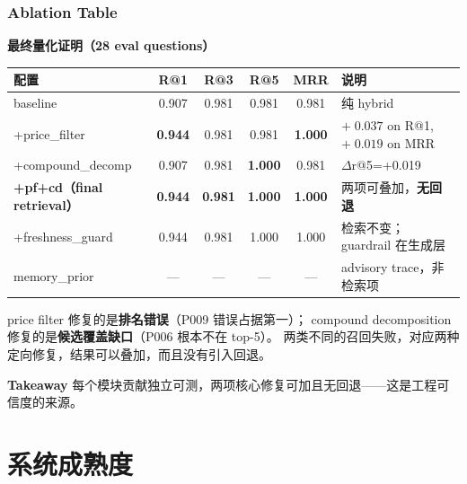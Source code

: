 \documentclass[aspectratio=169,10pt]{beamer}
\newcommand{\takeaway}[1]{%
  \vfill%
  \begin{tcolorbox}[
    colback=Ctakebg, colframe=Ctakebg,
    arc=0pt, boxrule=0pt,
    left=7pt, right=7pt, top=4pt, bottom=4pt,
    width=\linewidth, nobeforeafter
  ]%
    {\scriptsize\color{white}\textbf{Takeaway}\enspace%
     \color{white!88!Ctakebg}#1}%
  \end{tcolorbox}%
}
\newcommand{\hi}[1]{{\bfseries\color{Cgreen}#1}}      %
\begin{document}
\begin{frame}
\frametitle{Ablation Table}

{\small\bfseries\color{Cmuted}最终量化证明（28 eval questions）}\\[0.08cm]
{\footnotesize\renewcommand{\arraystretch}{1.18}
\begin{tabularx}{\textwidth}{lccccX}
\toprule
\bfseries 配置 & \bfseries R@1 & \bfseries R@3 & \bfseries R@5 & \bfseries MRR & \bfseries 说明 \\
\midrule
baseline               & 0.907 & 0.981 & 0.981 & 0.981 & 纯 hybrid \\
\rowcolor{Cgraylt}
+price\_filter         & \hi{0.944} & 0.981 & 0.981 & \hi{1.000} & $+\;0.037$ on R@1,\ $+\;0.019$ on MRR \\
+compound\_decomp      & 0.907 & 0.981 & \hi{1.000} & 0.981 & $\Delta$r@5=+0.019 \\
\rowcolor{Cgreelt}
\bfseries +pf+cd（final retrieval） & \hi{\bfseries 0.944} & \bfseries 0.981 & \hi{\bfseries 1.000} & \hi{\bfseries 1.000} & 两项可叠加，\hi{无回退} \\
+freshness\_guard      & 0.944 & 0.981 & 1.000 & 1.000 & 检索不变；guardrail 在生成层 \\
\rowcolor{Cgraylt}
memory\_prior          & — & — & — & — & advisory trace，非检索项 \\
\bottomrule
\end{tabularx}}

\vspace{0.12cm}
\begin{tcolorbox}[tcblue]
\footnotesize
price filter 修复的是\textbf{排名错误}（P009 错误占据第一）；  
compound decomposition 修复的是\textbf{候选覆盖缺口}（P006 根本不在 top-5）。  
两类不同的召回失败，对应两种定向修复，结果可以叠加，而且没有引入回退。
\end{tcolorbox}

\takeaway{每个模块贡献独立可测，两项核心修复可加且无回退——这是工程可信度的来源。}
\end{frame}


\section{系统成熟度}
\end{document}
